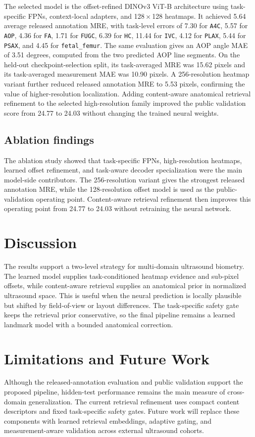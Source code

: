 \documentclass[runningheads]{llncs}
\begin{document}
The selected model is the offset-refined DINOv3 ViT-B architecture using task-specific FPNs, context-local adapters, and 128\,$\times$\,128 heatmaps. It achieved 5.64 average released annotation MRE, with task-level errors of 7.30 for \texttt{A4C}, 5.57 for \texttt{AOP}, 4.36 for \texttt{FA}, 1.71 for \texttt{FUGC}, 6.39 for \texttt{HC}, 11.44 for \texttt{IVC}, 4.12 for \texttt{PLAX}, 5.44 for \texttt{PSAX}, and 4.45 for \texttt{fetal\_femur}. The same evaluation gives an AOP angle MAE of 3.51 degrees, computed from the two predicted AOP line segments. On the held-out checkpoint-selection split, its task-averaged MRE was 15.62 pixels and its task-averaged measurement MAE was 10.90 pixels. A 256-resolution heatmap variant further reduced released annotation MRE to 5.53 pixels, confirming the value of higher-resolution localization. Adding content-aware anatomical retrieval refinement to the selected high-resolution family improved the public validation score from 24.77 to 24.03 without changing the trained neural weights.

\subsection{Ablation findings}
The ablation study showed that task-specific FPNs, high-resolution heatmaps, learned offset refinement, and task-aware decoder specialization were the main model-side contributors. The 256-resolution variant gives the strongest released annotation MRE, while the 128-resolution offset model is used as the public-validation operating point. Content-aware retrieval refinement then improves this operating point from 24.77 to 24.03 without retraining the neural network.

\section{Discussion}
The results support a two-level strategy for multi-domain ultrasound biometry. The learned model supplies task-conditioned heatmap evidence and sub-pixel offsets, while content-aware retrieval supplies an anatomical prior in normalized ultrasound space. This is useful when the neural prediction is locally plausible but shifted by field-of-view or layout differences. The task-specific safety gate keeps the retrieval prior conservative, so the final pipeline remains a learned landmark model with a bounded anatomical correction.

\section{Limitations and Future Work}
Although the released-annotation evaluation and public validation support the proposed pipeline, hidden-test performance remains the main measure of cross-domain generalization. The current retrieval refinement uses compact content descriptors and fixed task-specific safety gates. Future work will replace these components with learned retrieval embeddings, adaptive gating, and measurement-aware validation across external ultrasound cohorts.
\end{document}
